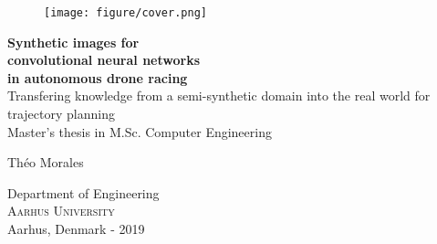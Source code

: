 
\begin{titlepage}
			
\addtolength{\voffset}{2cm}

\begin{figure}[H]
\centering
\vspace{2cm}	%
\texttt{[image: figure/cover.png]}
\end{figure}

\mbox{}
\vfill
\renewcommand{\familydefault}{\sfdefault} \normalfont %
\textbf{{\Huge 	Synthetic images for \\[0.2cm] 
		convolutional neural networks \\[0.3cm]
		in autonomous drone racing }} 	\\[0.5cm]
{\Large Transfering knowledge from a semi-synthetic domain into the real world
for trajectory planning}\\[0.5cm]
Master's thesis in M.Sc. Computer Engineering \setlength{\parskip}{1cm}

{\Large Théo Morales \setlength{\parskip}{2.9cm}}

Department of Engineering \\
\textsc{Aarhus University} \\
Aarhus, Denmark - 2019

\renewcommand{\familydefault}{\rmdefault} \normalfont %
\end{titlepage}




